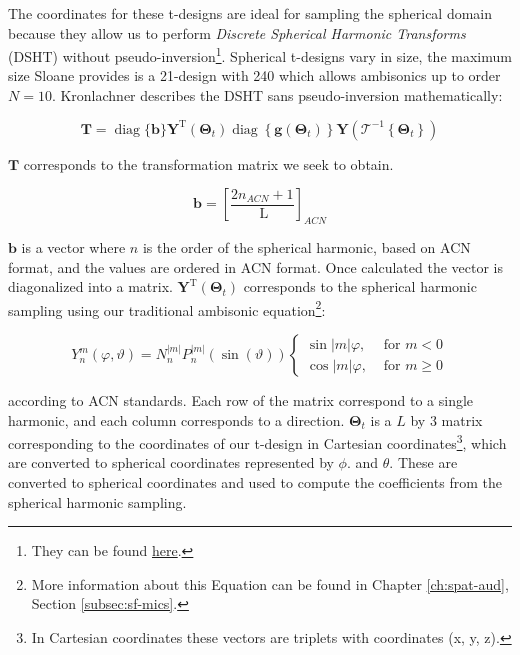 
The coordinates for these t-designs are ideal for sampling the spherical domain because they allow us to perform \textit{Discrete Spherical Harmonic Transforms} (DSHT) without pseudo-inversion\footnote{They can be found \href{http://neilsloane.com/sphdesigns/}{here}.}. Spherical t-designs vary in size, the maximum size Sloane provides is a 21-design with 240 which allows ambisonics up to order $N = 10$. Kronlachner describes the DSHT sans pseudo-inversion mathematically:

\begin{equation}
\boldsymbol{T}=\operatorname{diag}\{\boldsymbol{b}\} \boldsymbol{Y}^{\mathrm{T}}\left(\boldsymbol{\Theta}_{t}\right) \operatorname{diag}\left\{\boldsymbol{g}\left(\boldsymbol{\Theta}_{t}\right)\right\} \boldsymbol{Y}\left(\mathcal{T}^{-1}\left\{\boldsymbol{\Theta}_{t}\right\}\right)
\end{equation}
 
$\textbf{T}$ corresponds to the transformation matrix we seek to obtain.

\begin{equation}
\boldsymbol{b}=\left[\frac{2 n_{A C N}+1}{\mathrm{~L}}\right]_{A C N}
\end{equation}

$\boldsymbol{b}$ is a vector where $n$ is the order of the spherical harmonic, based on ACN format, and the values are ordered in ACN format. Once calculated the vector is diagonalized into a matrix. $\boldsymbol{Y}^{\mathrm{T}}\left(\boldsymbol{\Theta}_{t}\right)$ corresponds to the spherical harmonic sampling using our traditional ambisonic equation\footnote{More information about this Equation can be found in Chapter \ref{ch:spat-aud}, Section \ref{subsec:sf-mics}.}:

$$
Y_{n}^{m}(\varphi, \vartheta)=N_{n}^{|m|} P_{n}^{|m|}(\sin (\vartheta))\left\{\begin{array}{ll}
\sin |m| \varphi, & \text { for } m<0 \\
\cos |m| \varphi, & \text { for } m \geq 0
\end{array}\right.
$$

according to ACN standards. Each row of the matrix correspond to a single harmonic, and each column corresponds to a direction. $\boldsymbol{\Theta}_{t}$ is a $L$ by 3 matrix corresponding to the coordinates of our t-design in Cartesian coordinates\footnote{In Cartesian coordinates these vectors are triplets with coordinates (x, y, z).}, which are converted to spherical coordinates represented by $\phi$. and $\theta$. These are converted to spherical coordinates and used to compute the coefficients from the spherical harmonic sampling. 

